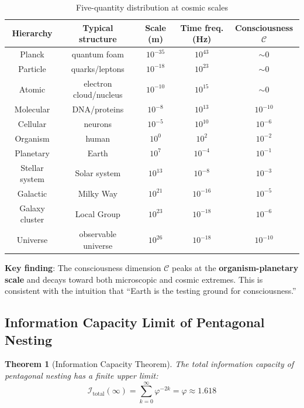 \documentclass[12pt,a4paper,twocolumn]{article}
\renewcommand{\phi}{\varphi}
\newtheorem{theorem}{Theorem}[section]
\begin{document}
\begin{table}[H]
\centering
\footnotesize
\caption{Five-quantity distribution at cosmic scales}
\begin{tabular}{c|c|c|c|c}
\hline
\textbf{Hierarchy} & \textbf{Typical structure} & \textbf{Scale (m)} & \textbf{Time freq. (Hz)} & \textbf{Consciousness $\mathcal{C}$} \\
\hline
Planck & quantum foam & $10^{-35}$ & $10^{43}$ & $\sim 0$ \\
Particle & quarks/leptons & $10^{-18}$ & $10^{23}$ & $\sim 0$ \\
Atomic & electron cloud/nucleus & $10^{-10}$ & $10^{15}$ & $\sim 0$ \\
Molecular & DNA/proteins & $10^{-8}$ & $10^{13}$ & $10^{-10}$ \\
Cellular & neurons & $10^{-5}$ & $10^{10}$ & $10^{-6}$ \\
Organism & human & $10^{0}$ & $10^{2}$ & $10^{-2}$ \\
Planetary & Earth & $10^{7}$ & $10^{-4}$ & $10^{-1}$ \\
Stellar system & Solar system & $10^{13}$ & $10^{-8}$ & $10^{-3}$ \\
Galactic & Milky Way & $10^{21}$ & $10^{-16}$ & $10^{-5}$ \\
Galaxy cluster & Local Group & $10^{23}$ & $10^{-18}$ & $10^{-6}$ \\
Universe & observable universe & $10^{26}$ & $10^{-18}$ & $10^{-10}$ \\
\hline
\end{tabular}
\end{table}

\textbf{Key finding}: The consciousness dimension $\mathcal{C}$ peaks at the \textbf{organism-planetary scale} and decays toward both microscopic and cosmic extremes. This is consistent with the intuition that ``Earth is the testing ground for consciousness.''

\subsection{Information Capacity Limit of Pentagonal Nesting}

\begin{theorem}[Information Capacity Theorem]
The total information capacity of pentagonal nesting has a finite upper limit:
\begin{equation}
\mathcal{I}_{\text{total}}(\infty) = \sum_{k=0}^{\infty}\phi^{-2k} = \phi \approx 1.618
\end{equation}
\end{theorem}
\end{document}
